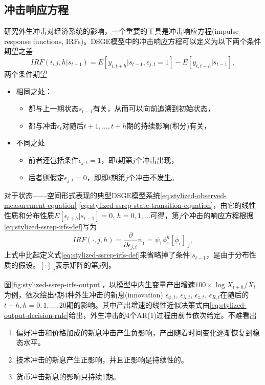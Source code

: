 \subsection{冲击响应方程}
\label{sec:stylized-ssrep-irfs}
研究外生冲击对经济系统的影响，一个重要的工具是冲击响应方程(impulse-response functions, IRFs)。DSGE模型中的冲击响应方程可以定义为以下两个条件期望之差
\begin{equation}
  \label{eq:stylized-ssrep-irfs-def}
  IRF \left( i, j, h | s_{t-1} \right) =
  E \left[ y_{i,t+h} | s_{t-1}, \epsilon_{j,t}=1 \right]
  - E \left[ y_{i,t+h} | s_{t-1} \right],
\end{equation}
两个条件期望
\begin{itemize}
  \item 相同之处：
  \begin{itemize}
    \item 都与上一期状态$s_{t-1}$有关，从而可以向前追溯到初始状态，
    \item 都与冲击$\epsilon_{t}$对随后$t+1,\ldots,t+h$期的持续影响(积分)有关，
  \end{itemize}
  \item 不同之处
  \begin{itemize}
    \item 前者还包括条件$\epsilon_{j,t}=1$，即$t$期第$j$个冲击出现，
    \item 后者则假定$\epsilon_{j,t}=0$，即即$t$期第$j$个冲击不发生。
  \end{itemize}
\end{itemize}

对于状态——空间形式表现的典型DSGE模型系统\eqref{eq:stylized-observed-measurement-equation} \eqref{eq:stylized-ssrep-state-transition-equation}，由它的线性性质和分布性质$E \left[ \epsilon_{t+h} | s_{t-1} \right] = 0, \, h=0,1,\ldots $可得，第$j$个冲击的响应方程根据\eqref{eq:stylized-ssrep-irfs-def}写为
\begin{equation}
  \label{eq:stylized-ssrep-irfs}
  IRF \left( \cdot , j, h \right) =
  \frac{\partial}{\partial \epsilon_{j,t}} \psi_{1}
  = \psi_{1} \phi_{1}^{h} \left[ \phi_{\epsilon} \right]_{.j},
\end{equation}
上式中比起定义式\eqref{eq:stylized-ssrep-irfs-def}来省略掉了条件$| s_{t-1}$，是由于分布性质的假设。$\left[ \cdot \right]_{.j}$表示矩阵的第$j$列。

图\ref{fig:stylized-ssrep-irfs-output}，以模型中内生变量产出增速$ 100 \times \log X_{t+h}/X_{t}$为例，依次绘出$t$期4种外生冲击的新息(innovation) $\epsilon_{\phi,t}, \, \epsilon_{\lambda,t}, \, \epsilon_{z,t}, \, \epsilon_{R,t}$在随后的$t+h, h=0,1,\ldots,20$期的影响。其中产出增速的线性近似决策式由\eqref{eq:stylized-output-decision-rule}给出，外生冲击的4个AR(1)过程由前节依次给定。不难看出
\begin{enumerate}
  \item 偏好冲击和价格加成的新息冲击产生负影响，产出随着时间变化逐渐恢复到稳态水平。
  \item 技术冲击的新息产生正影响，并且正影响是持续性的。
  \item 货币冲击新息的影响只持续1期。
\end{enumerate}

